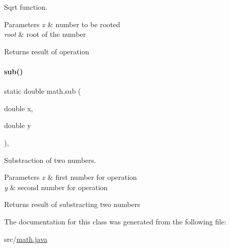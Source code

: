 Sqrt function. 


\begin{DoxyParams}{Parameters}
{\em x} & number to be rooted \\
\hline
{\em root} & root of the number \\
\hline
\end{DoxyParams}
\begin{DoxyReturn}{Returns}
result of operation 
\end{DoxyReturn}
\mbox{\label{classmath_a6a9bec211856c5b6cccf6062826ff758}} 
\paragraph{\texorpdfstring{sub()}{sub()}}
{\footnotesize\ttfamily static double math.\+sub (\begin{DoxyParamCaption}\item[{double}]{x,  }\item[{double}]{y }\end{DoxyParamCaption})\hspace{0.3cm}{\ttfamily [inline]}, {\ttfamily [static]}}



Substraction of two numbers. 


\begin{DoxyParams}{Parameters}
{\em x} & first number for operation \\
\hline
{\em y} & second number for operation \\
\hline
\end{DoxyParams}
\begin{DoxyReturn}{Returns}
result of substracting two numbers 
\end{DoxyReturn}


The documentation for this class was generated from the following file\+:\begin{DoxyCompactItemize}
\item 
src/\hyperlink{math_8java}{math.\+java}\end{DoxyCompactItemize}
